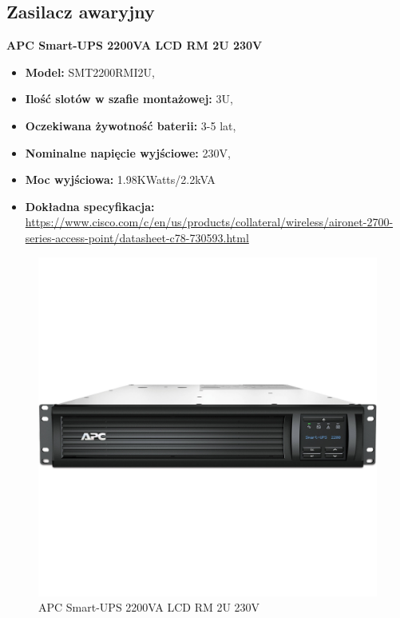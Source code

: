 \documentclass[12pt,a4paper,titlepage]{article}
\begin{document}
\subsection{Zasilacz awaryjny}
\textbf{APC Smart-UPS 2200VA LCD RM 2U 230V}
\begin{itemize}
    \item \textbf{Model:} SMT2200RMI2U,
    \item \textbf{Ilość slotów w szafie montażowej:} 3U,
    \item \textbf{Oczekiwana żywotność baterii:} 3-5 lat,
    \item \textbf{Nominalne napięcie wyjściowe:} 230V,
    \item \textbf{Moc wyjściowa:} 1.98KWatts/2.2kVA
    \item \textbf{Dokładna specyfikacja:} \url{https://www.cisco.com/c/en/us/products/collateral/wireless/aironet-2700-series-access-point/datasheet-c78-730593.html}
\end{itemize}
\begin{figure}[H]
  \centering
    \includegraphics[width=14cm]{images/ups.jpg}
    \caption{APC Smart-UPS 2200VA LCD RM 2U 230V}
    \label{fig:ups}
\end{figure}

\newpage
\listoftables
\listoffigures
\end{document}
